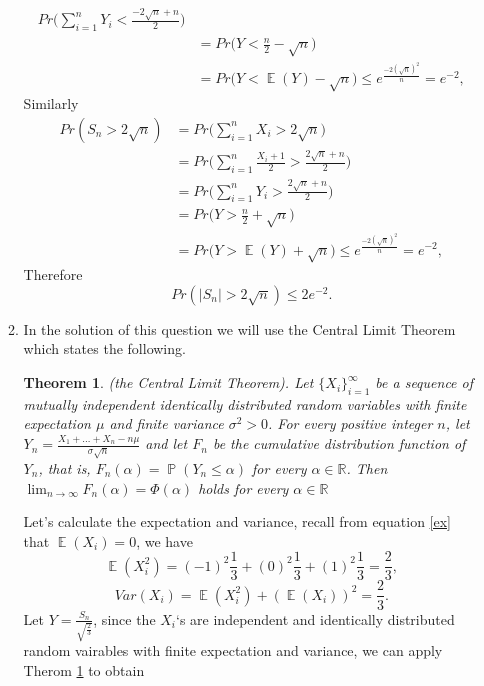 \documentclass[a4paper, 11pt, oneside]{article}
\newtheorem{theorem}{Theorem}[section]
\newcommand{\R}{\mathbb{R}}
\newcommand\abs[1]{\left|#1\right|}
\DeclareMathOperator{\EX}{\mathbb{E}}
\DeclareMathOperator{\PX}{\mathbb{P}}
\begin{document}
\begin{enumerate}
\begin{enumerate}
\begin{align*}
 Pr\bigg(\sum_{i=1}^nY_i<\frac{-2\sqrt{n}+n}{2}\bigg)\\&=
 Pr\bigg(Y<\frac{n}{2} - \sqrt{n}\bigg)\\&=
  Pr\bigg(Y<\EX(Y) - \sqrt{n}\bigg) \leq e^{\frac{-2(\sqrt{n})^2}{n}} = e^{-2},
\end{align*}
Similarly
\begin{align*}
 Pr(S_n>2\sqrt{n}) &=
 Pr\bigg(\sum_{i=1}^nX_i>2\sqrt{n}\bigg) \\&=
 Pr\bigg(\sum_{i=1}^n\frac{X_i+1}{2}>\frac{2\sqrt{n}+n}{2}\bigg)\\&=
 Pr\bigg(\sum_{i=1}^nY_i>\frac{2\sqrt{n}+n}{2}\bigg)\\&=
 Pr\bigg(Y>\frac{n}{2} + \sqrt{n}\bigg)\\&=
  Pr\bigg(Y>\EX(Y) + \sqrt{n}\bigg) \leq e^{\frac{-2(\sqrt{n})^2}{n}} = e^{-2},
\end{align*}
Therefore
\begin{equation*}
Pr(\abs{S_n}>2\sqrt{n}) \leq 2 e^{-2}.
 \end{equation*}
 \item  In the solution of this question we will use the Central Limit Theorem which states the following.
\begin{theorem} 
\label{central}
(the Central Limit Theorem). Let $\{X_i\}^\infty_{i=1}$ be a sequence of mutually independent identically distributed random variables 
with finite expectation $\mu$ and finite variance $\sigma^2>0$. For every positive integer $n$, let $Y_n = \frac{X_1 + \ldots + X_n - n \mu}{\sigma\sqrt{n}}$
and let $F_n$ be the cumulative distribution function of $Y_n$, that is, $F_n(\alpha) = \PX(Y_n\leq\alpha)$ for every $\alpha\in \R$. 
Then $\lim_{n \to \infty} F_n(\alpha) = \Phi(\alpha)$ holds for every $\alpha \in \R$
\end{theorem} 
Let's calculate the expectation and variance, recall from equation \ref{ex} that $\EX(X_i) = 0$, we have
\begin{equation*}
\EX(X_i^2) = (-1)^2 \frac{1}{3} + (0)^2 \frac{1}{3} + (1)^2 \frac{1}{3} = \frac{2}{3},
 \end{equation*}
\begin{equation*}
Var(X_i) = \EX(X_i^2) + (\EX(X_i))^2 = \frac{2}{3}.
 \end{equation*}
 Let $Y = \frac{S_n}{\sqrt{\frac{2}{3}}}$,
since the $X_i$`s are independent and identically distributed random vairables with finite expectation and variance, 
 we can apply Therom \ref{central} to obtain
 \begin{align*}

\end{align*}
\end{enumerate}
\end{enumerate}
\end{document}
